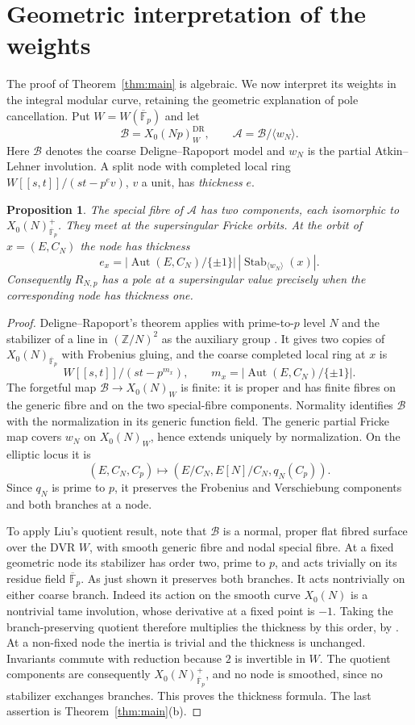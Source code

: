 \documentclass[11pt,a4paper]{article}
\numberwithin{equation}{section}
\newtheorem{proposition}[theorem]{Proposition}
\theoremstyle{definition}
\theoremstyle{remark}
\newcommand{\Fb}{\overline{\mathbb F}_p}
\newcommand{\Z}{\mathbb Z}
\newcommand{\Aut}{\operatorname{Aut}}
\newcommand{\Stab}{\operatorname{Stab}}
\begin{document}
\section{Geometric interpretation of the weights}\label{sec:geometry}
The proof of Theorem~\ref{thm:main} is algebraic. We now interpret its weights in
the integral modular curve, retaining the geometric explanation of pole cancellation.
Put $W=W(\Fb)$ and let
\[
\mathcal B=X_0(Np)^{\mathrm{DR}}_W,\qquad
\mathcal A=\mathcal B/\langle w_N\rangle.
\]
Here $\mathcal B$ denotes the coarse Deligne--Rapoport model and $w_N$ is the
partial Atkin--Lehner involution. A split node with completed local ring
$W[[s,t]]/(st-p^ev)$, $v$ a unit, has \emph{thickness} $e$.

\begin{proposition}\label{prop:geometry}
The special fibre of $\mathcal A$ has two components, each isomorphic to
$X_0(N)^+_{\Fb}$. They meet at the supersingular Fricke orbits. At the orbit of
$x=(E,C_N)$ the node has thickness
\[
e_x=|\Aut(E,C_N)/\{\pm1\}|\,
|\Stab_{\langle w_N\rangle}(x)|.
\]
Consequently $R_{N,p}$ has a pole at a supersingular value precisely when the
corresponding node has thickness one.
\end{proposition}
\begin{proof}
Deligne--Rapoport's theorem applies with prime-to-$p$ level $N$ and the stabilizer
of a line in $(\Z/N)^2$ as the auxiliary group
\citep[V, 1.14--1.20; VI, Theorem~6.9, especially (6.9.1)]{DR73}.
It gives two copies of $X_0(N)_{\Fb}$ with Frobenius gluing, and the coarse
completed local ring at $x$ is
\[
W[[s,t]]/(st-p^{m_x}),\qquad m_x=|\Aut(E,C_N)/\{\pm1\}|.
\]
The forgetful map $\mathcal B\to X_0(N)_W$ is finite: it is proper and has finite
fibres on the generic fibre and on the two special-fibre components.
Normality identifies $\mathcal B$ with the normalization in its generic function
field. The generic partial Fricke map covers $w_N$ on $X_0(N)_W$, hence extends
uniquely by normalization. On the elliptic locus it is
\[
(E,C_N,C_p)\longmapsto(E/C_N,E[N]/C_N,q_N(C_p)).
\]
Since $q_N$ is prime to $p$, it preserves the Frobenius and Verschiebung components
and both branches at a node.

To apply Liu's quotient result, note that $\mathcal B$ is a normal,
proper flat fibred surface over the DVR $W$, with smooth generic fibre
and nodal special fibre. At a fixed geometric node its stabilizer has
order two, prime to $p$, and acts trivially on its residue field $\Fb$.
As just shown it preserves both branches. It acts nontrivially on either
coarse branch. Indeed its action on the smooth curve $X_0(N)$ is a nontrivial
tame involution, whose derivative at a fixed point is $-1$.
Taking the branch-preserving quotient therefore multiplies the thickness by
this order, by \citet[Proposition~10.3.48(b)--(c), pp.~526--528]{Liu02}.
At a non-fixed node the inertia is trivial and the thickness is unchanged.
Invariants commute with reduction because $2$ is invertible in $W$.
The quotient components are consequently $X_0(N)^+_{\Fb}$, and no node is
smoothed, since no stabilizer exchanges branches. This proves the thickness formula.
The last assertion is Theorem~\ref{thm:main}(b).
\end{proof}
\end{document}
